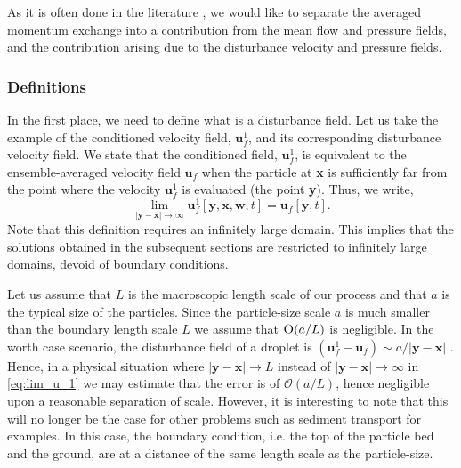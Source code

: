 As it is often done in the literature \citep{zhang1994ensemble,jackson2000,wang2021numerical,wang2024effect}, we would like to separate the averaged momentum exchange into a contribution from the mean flow and pressure fields, and the contribution arising due to the disturbance velocity and pressure fields.  

\subsubsection{Definitions}

In the first place, we need to define what is a disturbance field.
Let us take the example of the conditioned velocity field, $\textbf{u}_f^1$, and its corresponding disturbance velocity field.
We state that the conditioned field, $\textbf{u}_f^1$, is equivalent to the ensemble-averaged velocity field $\textbf{u}_f$ when the particle at \textbf{x} is sufficiently far from the point where the velocity $\textbf{u}_f^1$ is evaluated (the point \textbf{y}).
Thus, we write,  
\begin{equation}
    \lim_{|\textbf{y}-\textbf{x}|\to\infty} 
    \textbf{u}_f^1[\textbf{y},\textbf{x},\textbf{w},t]
    =
    \textbf{u}_f[\textbf{y},t]. 
    \label{eq:lim_u_1}
\end{equation} 
Note that this definition requires an infinitely large domain. 
This implies that the solutions obtained in the subsequent sections are restricted to infinitely large domains, devoid of boundary conditions.

Let us assume that $L$ is the macroscopic length scale of our process and that $a$  is the typical size of the particles.
Since the particle-size scale $a$ is much smaller than the boundary length scale $L$ we assume that $\textsc{O}(a/L)$ is negligible. 
In the worth case scenario, the disturbance field of a droplet is $(\textbf{u}_f^1- \textbf{u}_f)\sim a/|\textbf{y}-\textbf{x}|$ \citet{kim2013microhydrodynamics}.
Hence, in a physical situation where $|\textbf{y}-\textbf{x}|\to L$ instead of $|\textbf{y}-\textbf{x}|\to\infty$ in \ref{eq:lim_u_1} we may estimate that the error is of $\mathcal{O}(a/L)$, hence negligible upon a reasonable separation of scale.
However, it is interesting to note that this will no longer be the case for other problems such as sediment transport for examples.
In this case, the boundary condition, i.e. the top of the particle bed and the ground, are at a distance of the same length scale as the particle-size. 

